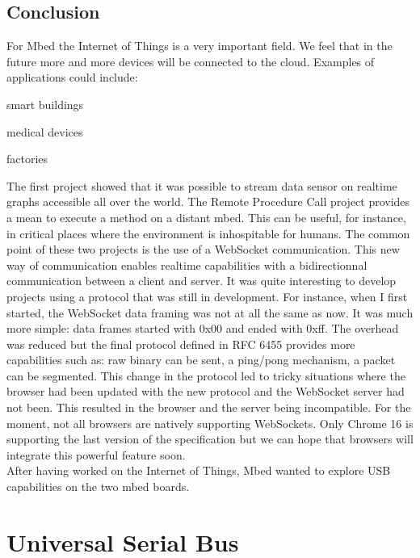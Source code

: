 \documentclass[pdftex,10pt,a4paper]{report}
\newenvironment{packed_item}{
\begin{itemize}
  \setlength{\itemsep}{1pt}
  \setlength{\parskip}{0pt}
  \setlength{\parsep}{0pt}
}{\end{itemize}}
\begin{document}
\section{Conclusion}
For Mbed the Internet of Things is a very important field. We feel that in the future more and more devices will be connected to the cloud. Examples of applications could include:
\begin{packed_item}
	\item smart buildings
	\item medical devices
	\item factories
\end{packed_item}

The first project showed that it was possible to stream data sensor on realtime graphs accessible all over the world. The Remote Procedure Call project provides a mean to execute a method on a distant mbed. This can be useful, for instance, in critical places where the environment is inhospitable for humans. The common point of these two projects is the use of a WebSocket communication. This new way of communication enables realtime capabilities with a bidirectionnal communication between a client and server. It was quite interesting to develop projects using a protocol that was still in development. For instance, when I first started, the WebSocket data framing was not at all the same as now. It was much more simple: data frames started with 0x00 and ended with 0xff. The overhead was reduced but the final protocol defined in RFC 6455 provides more capabilities such as: raw binary can be sent, a ping/pong mechanism, a packet can be segmented. This change in the protocol led to tricky situations where the browser had been updated with the new protocol and the WebSocket server had not been. This resulted in the browser and the server being incompatible. For the moment, not all browsers are natively supporting WebSockets. Only Chrome 16 is supporting the last version of the specification but we can hope that browsers will integrate this powerful feature soon.\\



After having worked on the Internet of Things, Mbed wanted to explore USB capabilities on the two mbed boards.
	
	
	
	
	
	
	
	
	
	

\chapter{Universal Serial Bus}
\end{document}
